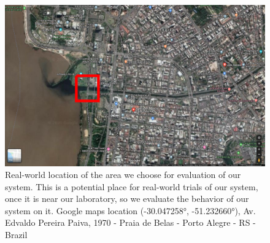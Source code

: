     
    \begin{figure}[H]
        \centering
        \includegraphics[scale=0.3]{figs/Chap5/simulation_diluvio_googleLocation_roundedArea.png}
        \caption{Real-world location of the area we choose for evaluation of our system. This is a potential place for real-world trials of our system, once it is near our laboratory, so we evaluate the behavior of our system on it. Google maps location (-30.047258°, -51.232660°), Av. Edvaldo Pereira Paiva, 1970 - Praia de Belas - Porto Alegre - RS - Brazil}
        \label{fig:simulation_diluvio_googleLocation_roundedArea}
    \end{figure}
    
